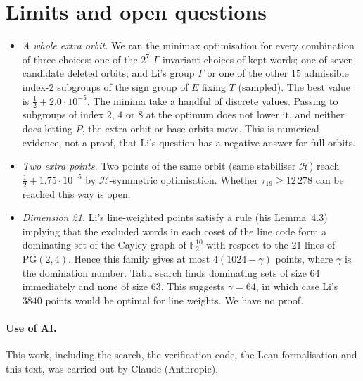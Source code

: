 \documentclass[11pt]{article}
\numberwithin{equation}{section}
\theoremstyle{definition}
\theoremstyle{remark}
\newcommand{\F}{\mathbb F}
\begin{document}
\section{Limits and open questions}\label{sec:limits}
\begin{itemize}
\item \emph{A whole extra orbit.} We ran the minimax optimisation for every combination of three
  choices: one of the $2^7$ $\Gamma$-invariant choices of kept words; one of seven candidate deleted
  orbits; and Li's group $\Gamma$ or one of the other $15$ admissible index-$2$ subgroups of the
  sign group of $E$ fixing $T$ (sampled). The best value is $\tfrac12+2.0\cdot10^{-5}$. The minima
  take a handful of discrete values. Passing to subgroups of index $2$, $4$ or $8$ at the optimum
  does not lower it, and neither does letting $P$, the extra orbit or base orbits move. This is
  numerical evidence, not a proof, that Li's question has a negative answer for full orbits.
\item \emph{Two extra points.} Two points of the same orbit (same stabiliser $\mathcal H$) reach
  $\tfrac12+1.75\cdot10^{-5}$ by $\mathcal H$-symmetric optimisation. Whether $\tau_{19}\ge12\,278$
  can be reached this way is open.
\item \emph{Dimension 21.} Li's line-weighted points satisfy a rule (his Lemma~4.3) implying that the
  excluded words in each coset of the line code form a dominating set of the Cayley graph of
  $\F_2^{10}$ with respect to the $21$ lines of $\mathrm{PG}(2,4)$. Hence this family gives at most
  $4(1024-\gamma)$ points, where $\gamma$ is the domination number. Tabu search finds dominating sets
  of size $64$ immediately and none of size $63$. This suggests $\gamma=64$, in which case Li's
  $3840$ points would be optimal for line weights. We have no proof.
\end{itemize}

\paragraph{Use of AI.} This work, including the search, the verification code, the Lean
formalisation and this text, was carried out by Claude (Anthropic).
\end{document}
